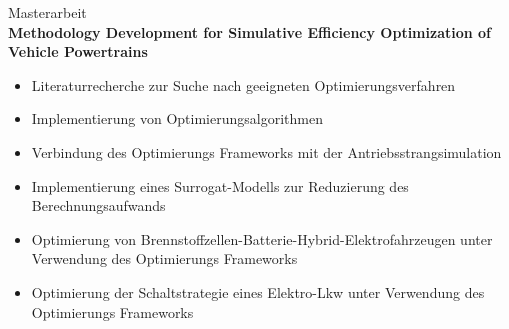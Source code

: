Masterarbeit\\
\textbf{Methodology Development for Simulative Efficiency Optimization of Vehicle Powertrains}
\begin{itemize}
	\item Literaturrecherche zur Suche nach geeigneten Optimierungsverfahren
	\item Implementierung von Optimierungsalgorithmen
	\item Verbindung des Optimierungs Frameworks mit der Antriebsstrangsimulation
	\item Implementierung eines Surrogat-Modells zur Reduzierung des Berechnungsaufwands
	\item Optimierung von Brennstoffzellen-Batterie-Hybrid-Elektrofahrzeugen unter Verwendung des Optimierungs Frameworks
	\item Optimierung der Schaltstrategie eines Elektro-Lkw unter Verwendung des Optimierungs Frameworks
\end{itemize}
\SmallSep

